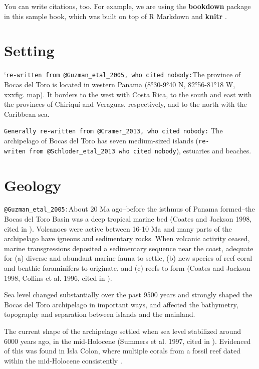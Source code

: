 \documentclass[]{book}
\begin{document}
You can write citations, too. For example, we are using the
\textbf{bookdown} package \citep{R-bookdown} in this sample book, which
was built on top of R Markdown and \textbf{knitr} \citep{xie2015}.

\section{Setting}\label{setting}

`\texttt{re-written\ from\ @Guzman\_etal\_2005,\ who\ cited\ nobody:}The
province of Bocas del Toro is located in western Panama (8°30-9°40 N,
82°56-81°18 W, xxxfig. map). It borders to the west with Costa Rica, to
the south and east with the provinces of Chiriquí and Veraguas,
respectively, and to the north with the Caribbean sea.

\texttt{Generally\ re-written\ from\ @Cramer\_2013,\ who\ cited\ nobody:}
The archipelago of Bocas del Toro has seven medium-sized islands
(\texttt{re-writen\ from\ @Schloder\_etal\_2013\ who\ cited\ nobody}),
estuaries and beaches.

\section{Geology}\label{geology}

\texttt{@Guzman\_etal\_2005:}About 20 Ma ago--before the isthmus of
Panama formed--the Bocas del Toro Basin was a deep tropical marine bed
(Coates and Jackson 1998, cited in \citet{Guzman_etal_2005}). Volcanoes
were active between 16-10 Ma and many parts of the archipelago have
igneous and sedimentary rocks. When volcanic activity ceased, marine
transgressions deposited a sedimentary sequence near the coast, adequate
for (a) diverse and abundant marine fauna to settle, (b) new species of
reef coral and benthic foraminifers to originate, and (c) reefs to form
(Coates and Jackson 1998, Collins et al. 1996, cited in
\citet{Guzman_etal_2005}).

Sea level changed substantially over the past 9500 years and strongly
shaped the Bocas del Toro archipelago in important ways, and affected
the bathymetry, topography and separation between islands and the
mainland.

The current shape of the archipelago settled when sea level stabilized
around 6000 years ago, in the mid-Holocene (Summers et al. 1997, cited
in \citet{Guzman_etal_2005}). Evidenced of this was found in Isla Colon,
where multiple corals from a fossil reef dated within the mid-Holocene
consistently \citep{Fredston_etal_2013}.
\end{document}
